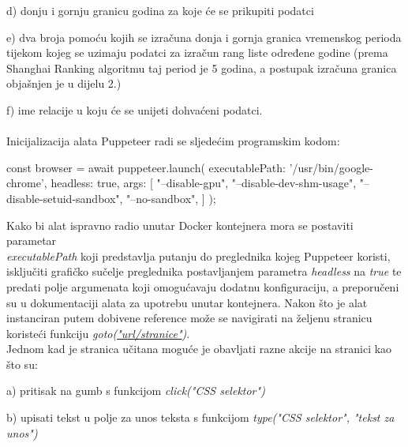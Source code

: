 \documentclass[times, utf8, zavrsni]{fer}
\begin{document}
    d) donju i gornju granicu godina za koje će se prikupiti podatci
    
    e) dva broja pomoću kojih se izračuna donja i gornja granica vremenskog perioda tijekom kojeg se uzimaju podatci za izračun rang liste određene godine
        (prema \\Shanghai Ranking algoritmu taj period je 5 godina, a postupak izračuna granica objašnjen je u dijelu 2.)
      
    f) ime relacije u koju će se unijeti dohvaćeni podatci.
\\\\Inicijalizacija alata Puppeteer radi se sljedećim programskim kodom:
\begin{verbnobox}[\fontsize{10pt}{10pt}\selectfont] 
const browser = await puppeteer.launch({
    executablePath: '/usr/bin/google-chrome',
    headless: true,
    args: [
        "--disable-gpu",
        "--disable-dev-shm-usage",
        "--disable-setuid-sandbox",
        "--no-sandbox",
        ]
});
\end{verbnobox}  
Kako bi alat ispravno radio unutar Docker kontejnera mora se postaviti parametar \\\emph{executablePath} koji predstavlja putanju 
do preglednika kojeg Puppeteer koristi, isključiti grafičko sučelje preglednika postavljanjem parametra \emph{headless} na \emph{true} te predati 
polje argumenata koji omogućavaju dodatnu konfiguraciju, a preporučeni su u dokumentaciji alata za upotrebu unutar kontejnera.
Nakon što je alat instanciran putem dobivene reference može se navigirati na željenu stranicu koristeći funkciju \emph{goto(\url{"url/stranice"})}.
\\Jednom kad je stranica učitana moguće je obavljati razne akcije na stranici kao što su:

    a) pritisak na gumb s funkcijom \emph{click("CSS selektor")}

    b) upisati tekst u polje za unos teksta s funkcijom \emph{type("CSS selektor", "tekst za unos")}
\end{document}
